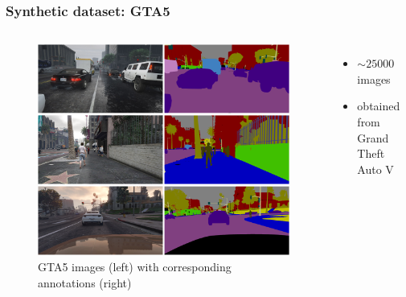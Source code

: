 \documentclass{beamer}
\begin{document}
\begin{frame}
\frametitle{Synthetic dataset: GTA5}
\begin{columns}[c]
	\begin{figure}
		\centering
		\includegraphics[width=\textwidth]{../images/p4d_example.png}
		\caption[GTA5 images]{GTA5 images (left) with corresponding annotations (right)}
	\end{figure}
	\begin{itemize}
		\item $\sim 25000$ images
		\item obtained from Grand Theft Auto V
	\end{itemize}
\end{columns}
\end{frame}
\end{document}

